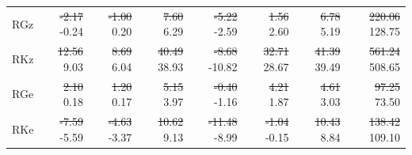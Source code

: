 \documentclass[pdflatex,sn-chicago]{sn-jnl}%
\makeatletter
\theoremstyle{plain}
\theoremstyle{definition}
\theoremstyle{remark}
\theoremstyle{definition}
\providecommand{\DIFaddtex}[1]{{\protect\color{blue}#1}} %
\providecommand{\DIFdeltex}[1]{{\protect\color{red}\sout{#1}}} %
\providecommand{\DIFaddFL}[1]{\DIFadd{#1}} %
\providecommand{\DIFdelFL}[1]{\DIFdel{#1}} %
\providecommand{\DIFaddbeginFL}{} %
\providecommand{\DIFaddendFL}{} %
\providecommand{\DIFdelbeginFL}{} %
\providecommand{\DIFdelendFL}{} %
\providecommand{\DIFadd}[1]{\texorpdfstring{\DIFaddtex{#1}}{#1}} %
\providecommand{\DIFdel}[1]{\texorpdfstring{\DIFdeltex{#1}}{}} %
\let\sout@orig\sout %
\renewcommand{\sout}[1]{\ifmmode\text{\sout@orig{\ensuremath{#1}}}\else\sout@orig{#1}\fi} %
\makeatother
\begin{document}
\begin{table}[!htbp]
\begin{tabular}{lrrrrrrr}
RGz & \DIFdelbeginFL \DIFdelFL{-2.17 }\DIFdelendFL \DIFaddbeginFL \DIFaddFL{-0.24 }\DIFaddendFL & \DIFdelbeginFL \DIFdelFL{-1.00 }\DIFdelendFL \DIFaddbeginFL \DIFaddFL{0.20 }\DIFaddendFL & \DIFdelbeginFL \DIFdelFL{7.60 }\DIFdelendFL \DIFaddbeginFL \DIFaddFL{6.29 }\DIFaddendFL & \DIFdelbeginFL \DIFdelFL{-5.22 }\DIFdelendFL \DIFaddbeginFL \DIFaddFL{-2.59 }\DIFaddendFL & \DIFdelbeginFL \DIFdelFL{1.56 }\DIFdelendFL \DIFaddbeginFL \DIFaddFL{2.60 }\DIFaddendFL & \DIFdelbeginFL \DIFdelFL{6.78 }\DIFdelendFL \DIFaddbeginFL \DIFaddFL{5.19 }\DIFaddendFL & \DIFdelbeginFL \DIFdelFL{220.06 }\DIFdelendFL \DIFaddbeginFL \DIFaddFL{128.75 }\DIFaddendFL \\
RKz & \DIFdelbeginFL \DIFdelFL{12.56 }\DIFdelendFL \DIFaddbeginFL \DIFaddFL{9.03 }\DIFaddendFL & \DIFdelbeginFL \DIFdelFL{8.69 }\DIFdelendFL \DIFaddbeginFL \DIFaddFL{6.04 }\DIFaddendFL & \DIFdelbeginFL \DIFdelFL{40.49 }\DIFdelendFL \DIFaddbeginFL \DIFaddFL{38.93 }\DIFaddendFL & \DIFdelbeginFL \DIFdelFL{-8.68 }\DIFdelendFL \DIFaddbeginFL \DIFaddFL{-10.82 }\DIFaddendFL & \DIFdelbeginFL \DIFdelFL{32.71 }\DIFdelendFL \DIFaddbeginFL \DIFaddFL{28.67 }\DIFaddendFL & \DIFdelbeginFL \DIFdelFL{41.39 }\DIFdelendFL \DIFaddbeginFL \DIFaddFL{39.49 }\DIFaddendFL & \DIFdelbeginFL \DIFdelFL{561.24 }\DIFdelendFL \DIFaddbeginFL \DIFaddFL{508.65 }\DIFaddendFL \\
RGe & \DIFdelbeginFL \DIFdelFL{2.10 }\DIFdelendFL \DIFaddbeginFL \DIFaddFL{0.18 }\DIFaddendFL & \DIFdelbeginFL \DIFdelFL{1.20 }\DIFdelendFL \DIFaddbeginFL \DIFaddFL{0.17 }\DIFaddendFL & \DIFdelbeginFL \DIFdelFL{5.15 }\DIFdelendFL \DIFaddbeginFL \DIFaddFL{3.97 }\DIFaddendFL & \DIFdelbeginFL \DIFdelFL{-0.40 }\DIFdelendFL \DIFaddbeginFL \DIFaddFL{-1.16 }\DIFaddendFL & \DIFdelbeginFL \DIFdelFL{4.21 }\DIFdelendFL \DIFaddbeginFL \DIFaddFL{1.87 }\DIFaddendFL & \DIFdelbeginFL \DIFdelFL{4.61 }\DIFdelendFL \DIFaddbeginFL \DIFaddFL{3.03 }\DIFaddendFL & \DIFdelbeginFL \DIFdelFL{97.25 }\DIFdelendFL \DIFaddbeginFL \DIFaddFL{73.50 }\DIFaddendFL \\
RKe & \DIFdelbeginFL \DIFdelFL{-7.59 }\DIFdelendFL \DIFaddbeginFL \DIFaddFL{-5.59 }\DIFaddendFL & \DIFdelbeginFL \DIFdelFL{-4.63 }\DIFdelendFL \DIFaddbeginFL \DIFaddFL{-3.37 }\DIFaddendFL & \DIFdelbeginFL \DIFdelFL{10.62 }\DIFdelendFL \DIFaddbeginFL \DIFaddFL{9.13 }\DIFaddendFL & \DIFdelbeginFL \DIFdelFL{-11.48 }\DIFdelendFL \DIFaddbeginFL \DIFaddFL{-8.99 }\DIFaddendFL & \DIFdelbeginFL \DIFdelFL{-1.04 }\DIFdelendFL \DIFaddbeginFL \DIFaddFL{-0.15 }\DIFaddendFL & \DIFdelbeginFL \DIFdelFL{10.43 }\DIFdelendFL \DIFaddbeginFL \DIFaddFL{8.84 }\DIFaddendFL & \DIFdelbeginFL \DIFdelFL{138.42 }\DIFdelendFL \DIFaddbeginFL \DIFaddFL{109.10 }\DIFaddendFL \\
\bottomrule
\end{tabular}
\end{table}
\end{document}
